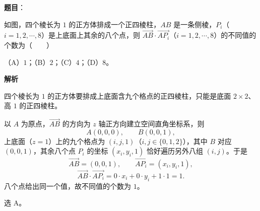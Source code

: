 \begin{answer}

\textbf{题目}：

如图，四个棱长为 $1$ 的正方体排成一个正四棱柱，$AB$ 是一条侧棱，$P_i$（$i=1,2,\cdots,8$）是上底面上其余的八个点，则 $\overrightarrow{AB}\cdot\overrightarrow{AP_i}$（$i=1,2,\cdots,8$）的不同值的个数为\mbox{（　　）}
\nopagebreak[4]
\begin{center}\end{center}
\nopagebreak[4]
（A）$1$；（B）$2$；（C）$4$；（D）$8$。

\textbf{解析}

四个棱长为 $1$ 的正方体要排成上底面含九个格点的正四棱柱，只能是底面 $2\times2$、高 $1$ 的正四棱柱。

以 $A$ 为原点，$\overrightarrow{AB}$ 的方向为 $z$ 轴正方向建立空间直角坐标系，则
\nopagebreak[4]
\[A(0,0,0),\qquad B(0,0,1),\]
上底面（$z=1$）上的九个格点为 $(i,j,1)$（$i,j\in\{0,1,2\}$），其中 $B$ 对应 $(0,0,1)$，其余八个点 $P_i$ 的坐标 $(x_i,y_i,1)$ 恰好遍历另外八组 $(i,j)$。于是
\nopagebreak[4]
\[\overrightarrow{AB}=(0,0,1),\qquad \overrightarrow{AP_i}=(x_i,y_i,1),\]
\nopagebreak[4]
\[\overrightarrow{AB}\cdot\overrightarrow{AP_i}=0\cdot x_i+0\cdot y_i+1\cdot1=1 .\]
八个点给出同一个值，故不同值的个数为 $1$。

选 A。


\end{answer}
